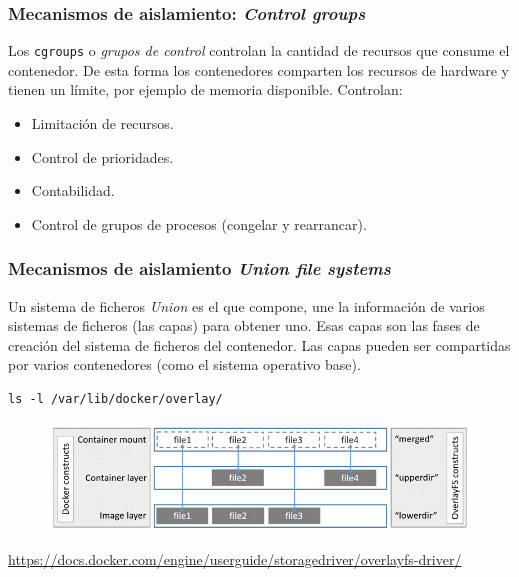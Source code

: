 \documentclass[xcolor=dvipsnames]{beamer}
\begin{document}
\begin{frame}[fragile]
	\frametitle{Mecanismos de aislamiento: \textit{Control groups}}

Los \texttt{cgroups} o \textit{grupos de control} controlan la cantidad de recursos que consume el contenedor. De esta forma los contenedores comparten los recursos de hardware y tienen un límite, por ejemplo de memoria disponible. Controlan:
		\begin{itemize}
			\item Limitación de recursos.
			\item Control de prioridades.
			\item Contabilidad.
			\item Control de grupos de procesos (congelar y rearrancar).
		\end{itemize}


\end{frame}

\begin{frame}[fragile]
	\frametitle{Mecanismos de aislamiento \textit{Union file systems}}

Un sistema de ficheros \textit{Union} es el que compone, une la información de varios sistemas de ficheros (las capas) para obtener uno. Esas capas son las fases de creación del sistema de ficheros del contenedor. Las capas pueden ser compartidas por varios contenedores (como el sistema operativo base).


	\begin{lstlisting}
ls -l /var/lib/docker/overlay/
	\end{lstlisting}

\begin{figure}
\centering
\includegraphics[width=\linewidth]{./overlay_constructs}
\label{fig:overlay_constructs}
\end{figure}

\url{https://docs.docker.com/engine/userguide/storagedriver/overlayfs-driver/}

\end{frame}
\end{document}
